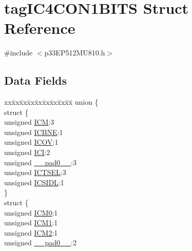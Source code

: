 \hypertarget{structtag_i_c4_c_o_n1_b_i_t_s}{}\section{tag\+I\+C4\+C\+O\+N1\+B\+I\+TS Struct Reference}
\label{structtag_i_c4_c_o_n1_b_i_t_s}


{\ttfamily \#include $<$p33\+E\+P512\+M\+U810.\+h$>$}

\subsection*{Data Fields}
\begin{DoxyCompactItemize}
\item 
\begin{tabbing}
xx\=xx\=xx\=xx\=xx\=xx\=xx\=xx\=xx\=\kill
union \{\\
\>struct \{\\
\>\>unsigned \hyperlink{structtag_i_c4_c_o_n1_b_i_t_s_ad3edde44ecb2d349ffa2decd0a251c20}{ICM}:3\\
\>\>unsigned \hyperlink{structtag_i_c4_c_o_n1_b_i_t_s_a824e7dcca83939e1b049d63ffcee33e9}{ICBNE}:1\\
\>\>unsigned \hyperlink{structtag_i_c4_c_o_n1_b_i_t_s_a49392949376ba0bf58cf8db889e86c94}{ICOV}:1\\
\>\>unsigned \hyperlink{structtag_i_c4_c_o_n1_b_i_t_s_a72486dcb868aad2d5c978494691356cc}{ICI}:2\\
\>\>unsigned \hyperlink{structtag_i_c4_c_o_n1_b_i_t_s_adf71f3d8410c1f1dbbc96680a92c49af}{\_\_pad0\_\_}:3\\
\>\>unsigned \hyperlink{structtag_i_c4_c_o_n1_b_i_t_s_a7a9dd41b5f93eb620df7fa336e452677}{ICTSEL}:3\\
\>\>unsigned \hyperlink{structtag_i_c4_c_o_n1_b_i_t_s_af441b36127c0bb7a35162dfc9a64103c}{ICSIDL}:1\\
\>\} \\
\>struct \{\\
\>\>unsigned \hyperlink{structtag_i_c4_c_o_n1_b_i_t_s_a649b1dd9bca75e558f37a9f52a829bd4}{ICM0}:1\\
\>\>unsigned \hyperlink{structtag_i_c4_c_o_n1_b_i_t_s_af3fe77ef9f8ca41ff11519f445e7bc77}{ICM1}:1\\
\>\>unsigned \hyperlink{structtag_i_c4_c_o_n1_b_i_t_s_a3c62c9cbbc3a406402126c932b709db8}{ICM2}:1\\
\>\>unsigned \hyperlink{structtag_i_c4_c_o_n1_b_i_t_s_adf71f3d8410c1f1dbbc96680a92c49af}{\_\_pad0\_\_}:2\\

\end{tabbing}
\end{DoxyCompactItemize}
